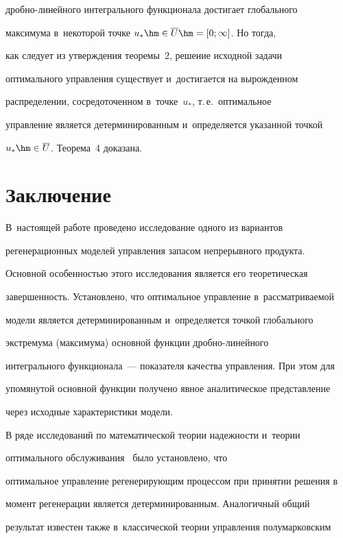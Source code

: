 дроб\-но-ли\-ней\-но\-го интегрального функционала достигает глобального 

максимума в~некоторой точке $u_*\hm\in \overline{U}\hm=[0;\infty]$. Но тогда, 

как следует из утверждения теоремы~2, решение исходной задачи 

оптимального управления существует и~достигается на вырожденном 

распределении, сосредоточенном в~точке~$u_*$, т.\,е.\ оптимальное 

управление является детерминированным и~определяется указанной точкой 

$u_*\hm\in \overline{U}$. Теорема~4 доказана.



\section{Заключение}



В~настоящей работе проведено исследование одного из вариантов 

регенерационных моделей управления запасом непрерывного продукта. 

Основной особенностью этого исследования является его теоретическая 

завершенность. Установлено, что оптимальное управление в~рассматриваемой 

модели является детерминированным и~определяется точкой глобального 

экстремума (максимума) основной функции дроб\-но-ли\-ней\-но\-го 

интегрального функционала~--- показателя качества управления. При этом для 

упомянутой основной функции получено явное аналитическое представление 

через исходные характеристики модели. 



  В ряде исследований по математической теории надежности и~теории 

оптимального обслуживания~\cite{15-sh, 16-sh} было установлено, что 

оптимальное управление регенерирующим процессом при принятии решения в~

момент регенерации является детерминированным. Аналогичный общий 

результат известен также в~классической теории управления полумарковским 

